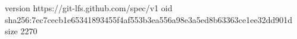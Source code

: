 version https://git-lfs.github.com/spec/v1
oid sha256:7ec7cecb1e65341893455f4af553b3ea556a98e3a5ed8b63363ce1ee32dd901d
size 2270
